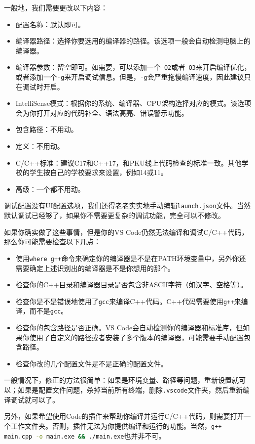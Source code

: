 一般地，我们需要更改以下内容：
\begin{itemize}
  \item 配置名称：默认即可。
  \item 编译器路径：选择你要选用的编译器的路径。该选项一般会自动检测电脑上的编译器。
  \item 编译器参数：留空即可。如需要，可以添加一个\texttt{-O2}或者\texttt{-O3}来开启编译优化，或者添加一个\texttt{-g}来开启调试信息。但是，\texttt{-g}会严重拖慢编译速度，因此建议只在调试时开启。
  \item IntelliSense模式：根据你的系统、编译器、CPU架构选择对应的模式。该选项会为你打开对应的代码补全、语法高亮、错误警示功能。
  \item 包含路径：不用动。
  \item 定义：不用动。
  \item C/C++标准：建议C17和C++17，和PKU线上代码检查的标准一致。其他学校的学生按自己的学校要求来设置，例如14或11。
  \item 高级：一个都不用动。
\end{itemize}

调试配置没有UI配置选项，我们还得老老实实地手动编辑\texttt{launch.json}文件。当然默认调试已经够了，如果你不需要更复杂的调试功能，完全可以不修改。

如果你确实做了这些事情，但是你的VS Code仍然无法编译和调试C/C++代码，那么你可能需要检查以下几点：
\begin{itemize}
  \item 使用\texttt{where g++}命令来确定你的编译器是不是在PATH环境变量中，另外你还需要确定上述识别出的编译器是不是你想用的那个。
  \item 检查你的C++目录和编译器目录是否包含非ASCII字符（如汉字、空格等）。
  \item 检查你是不是错误地使用了\texttt{gcc}来编译C++代码。C++代码需要使用\texttt{g++}来编译，而不是\texttt{gcc}。
  \item 检查你的包含路径是否正确。VS Code会自动检测你的编译器和标准库，但如果你使用了自定义的路径或者安装了多个版本的编译器，可能需要手动配置包含路径。
  \item 检查你改的几个配置文件是不是正确的配置文件。
\end{itemize}
一般情况下，修正的方法很简单：如果是环境变量、路径等问题，重新设置就可以；如果是配置文件问题，杀掉当前所有终端，删除\texttt{.vscode}文件夹，然后重新编译调试就可以了。

另外，如果希望使用Code的插件来帮助你编译并运行C/C++代码，则需要打开一个工作文件夹。否则，插件无法为你提供编译和运行的功能。当然，\lstinline[language=bash]|g++ main.cpp -o main.exe && ./main.exe|也并非不可。

